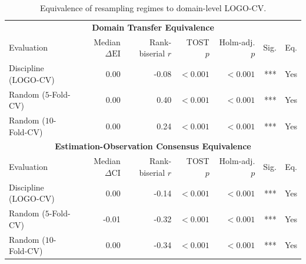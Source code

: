 \documentclass{article}
\begin{document}
\begin{table}[H]
\centering
\footnotesize
\captionsetup{position=top,skip=12pt}
\caption{Equivalence of resampling regimes to domain-level LOGO-CV.}
\label{tab:si-transfer-equivalence}
\begin{tabularx}{\linewidth}{@{}Xrrrrrr@{}}
\toprule
\multicolumn{7}{c}{\textbf{Domain Transfer Equivalence}} \\
\cmidrule(lr){1-7}
Evaluation & \shortstack{Median\\$\Delta\mathrm{EI}$} & \shortstack{Rank-biserial\\$r$} & \shortstack{TOST\\$p$} & \shortstack{Holm-adj.\\$p$} & Sig. & Eq. \\
\midrule
Discipline (LOGO-CV) & 0.00 & -0.08 & $<0.001$ & $<0.001$ & *** & Yes \\
Random ($5$-Fold-CV) & 0.00 & 0.40 & $<0.001$ & $<0.001$ & *** & Yes \\
Random ($10$-Fold-CV) & 0.00 & 0.24 & $<0.001$ & $<0.001$ & *** & Yes \\
\midrule
\multicolumn{7}{c}{\textbf{Estimation-Observation Consensus Equivalence}} \\
\cmidrule(lr){1-7}
Evaluation & \shortstack{Median\\$\Delta\mathrm{CI}$} & \shortstack{Rank-biserial\\$r$} & \shortstack{TOST\\$p$} & \shortstack{Holm-adj.\\$p$} & Sig. & Eq. \\
\midrule
Discipline (LOGO-CV) & 0.00 & -0.14 & $<0.001$ & $<0.001$ & *** & Yes \\
Random ($5$-Fold-CV) & -0.01 & -0.32 & $<0.001$ & $<0.001$ & *** & Yes \\
Random ($10$-Fold-CV) & 0.00 & -0.34 & $<0.001$ & $<0.001$ & *** & Yes \\
\bottomrule
\end{tabularx}
\par\vspace{12pt}
\begin{minipage}{\linewidth}
\footnotesize

\end{minipage}
\end{table}
\end{document}
